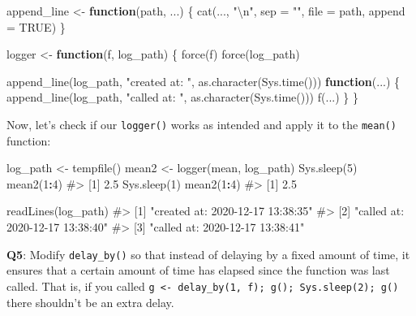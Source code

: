 \documentclass[
]{krantz}
\makeatletter
\newenvironment{Shaded}{\begin{snugshade}}{\end{snugshade}}
\newcommand{\CharTok}[1]{\textcolor[rgb]{0.31,0.60,0.02}{#1}}
\newcommand{\CommentTok}[1]{\textcolor[rgb]{0.56,0.35,0.01}{\textit{#1}}}
\newcommand{\ControlFlowTok}[1]{\textcolor[rgb]{0.13,0.29,0.53}{\textbf{#1}}}
\newcommand{\DataTypeTok}[1]{\textcolor[rgb]{0.13,0.29,0.53}{#1}}
\newcommand{\DecValTok}[1]{\textcolor[rgb]{0.00,0.00,0.81}{#1}}
\newcommand{\KeywordTok}[1]{\textcolor[rgb]{0.13,0.29,0.53}{\textbf{#1}}}
\newcommand{\NormalTok}[1]{#1}
\newcommand{\OperatorTok}[1]{\textcolor[rgb]{0.81,0.36,0.00}{\textbf{#1}}}
\newcommand{\OtherTok}[1]{\textcolor[rgb]{0.56,0.35,0.01}{#1}}
\newcommand{\StringTok}[1]{\textcolor[rgb]{0.31,0.60,0.02}{#1}}
\newenvironment{kframe}{%
\medskip{}
\setlength{\fboxsep}{.8em}
 \def\at@end@of@kframe{}%
 \ifinner\ifhmode%
  \def\at@end@of@kframe{\end{minipage}}%
  \begin{minipage}{\columnwidth}%
 \fi\fi%
 \def\FrameCommand##1{\hskip\@totalleftmargin \hskip-\fboxsep
 \colorbox{shadecolor}{##1}\hskip-\fboxsep
     \hskip-\linewidth \hskip-\@totalleftmargin \hskip\columnwidth}%
 \MakeFramed {\advance\hsize-\width
   \@totalleftmargin\z@ \linewidth\hsize
   \@setminipage}}%
 {\par\unskip\endMakeFramed%
 \at@end@of@kframe}
\renewenvironment{Shaded}{\begin{kframe}}{\end{kframe}}
\renewcommand{\KeywordTok} [1]{\textcolor[rgb]{0.00,0.44,0.13}{{#1}}}
\renewcommand{\DataTypeTok}[1]{\textcolor[rgb]{0.56,0.13,0.00}{{#1}}}
\renewcommand{\DecValTok}  [1]{\textcolor[rgb]{0.25,0.63,0.44}{{#1}}}
\renewcommand{\CharTok}    [1]{\textcolor[rgb]{0.25,0.44,0.63}{{#1}}}
\renewcommand{\StringTok}  [1]{\textcolor[rgb]{0.25,0.44,0.63}{{#1}}}
\renewcommand{\CommentTok} [1]{\textcolor[rgb]{0.38,0.63,0.69}{{#1}}}
\renewcommand{\OtherTok}   [1]{\textcolor[rgb]{0.00,0.44,0.13}{{#1}}}
\renewcommand{\NormalTok}  [1]{{#1}}
\makeatother
\begin{document}
\begin{Shaded}
\begin{Highlighting}[]
\NormalTok{append_line <-}\StringTok{ }\ControlFlowTok{function}\NormalTok{(path, ...) \{ }
  \KeywordTok{cat}\NormalTok{(..., }\StringTok{"}\CharTok{\textbackslash{}n}\StringTok{"}\NormalTok{, }\DataTypeTok{sep =} \StringTok{""}\NormalTok{, }\DataTypeTok{file =}\NormalTok{ path, }\DataTypeTok{append =} \OtherTok{TRUE}\NormalTok{)}
\NormalTok{\}}

\NormalTok{logger <-}\StringTok{ }\ControlFlowTok{function}\NormalTok{(f, log_path) \{}
  \KeywordTok{force}\NormalTok{(f)}
  \KeywordTok{force}\NormalTok{(log_path)}
  
  \KeywordTok{append_line}\NormalTok{(log_path, }\StringTok{"created at: "}\NormalTok{, }\KeywordTok{as.character}\NormalTok{(}\KeywordTok{Sys.time}\NormalTok{()))}
  \ControlFlowTok{function}\NormalTok{(...) \{}
    \KeywordTok{append_line}\NormalTok{(log_path, }\StringTok{"called at: "}\NormalTok{, }\KeywordTok{as.character}\NormalTok{(}\KeywordTok{Sys.time}\NormalTok{()))}
    \KeywordTok{f}\NormalTok{(...)}
\NormalTok{  \}}
\NormalTok{\}}
\end{Highlighting}
\end{Shaded}

Now, let's check if our \texttt{logger()} works as intended and apply it to the \texttt{mean()} function:

\begin{Shaded}
\begin{Highlighting}[]
\NormalTok{log_path <-}\StringTok{ }\KeywordTok{tempfile}\NormalTok{()}
\NormalTok{mean2 <-}\StringTok{ }\KeywordTok{logger}\NormalTok{(mean, log_path)}
\KeywordTok{Sys.sleep}\NormalTok{(}\DecValTok{5}\NormalTok{)}
\KeywordTok{mean2}\NormalTok{(}\DecValTok{1}\OperatorTok{:}\DecValTok{4}\NormalTok{) }
\CommentTok{#> [1] 2.5}
\KeywordTok{Sys.sleep}\NormalTok{(}\DecValTok{1}\NormalTok{)}
\KeywordTok{mean2}\NormalTok{(}\DecValTok{1}\OperatorTok{:}\DecValTok{4}\NormalTok{)}
\CommentTok{#> [1] 2.5}

\KeywordTok{readLines}\NormalTok{(log_path)}
\CommentTok{#> [1] "created at: 2020-12-17 13:38:35"}
\CommentTok{#> [2] "called at: 2020-12-17 13:38:40" }
\CommentTok{#> [3] "called at: 2020-12-17 13:38:41"}
\end{Highlighting}
\end{Shaded}

\textbf{{Q5}}: Modify \texttt{delay\_by()} so that instead of delaying by a fixed amount of time, it ensures that a certain amount of time has elapsed since the function was last called. That is, if you called \texttt{g\ \textless{}-\ delay\_by(1,\ f);\ g();\ Sys.sleep(2);\ g()} there shouldn't be an extra delay.
\end{document}
